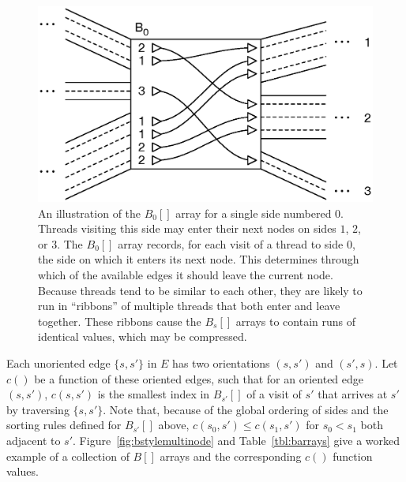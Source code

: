 \begin{figure}[h!]
\centering
\includegraphics[width=\linewidth]{figures/03_gpbwt/barray.eps}
\caption{An illustration of the $B_{0}[]$ array for a single side numbered $0$. Threads visiting this side may enter their next nodes on sides $1$, $2$, or $3$. The $B_0[]$ array records, for each visit of a thread to side $0$, the side on which it enters its next node. This determines through which of the available edges it should leave the current node. Because threads tend to be similar to each other, they are likely to run in ``ribbons'' of multiple threads that both enter and leave together. These ribbons cause the $B_s[]$ arrays to contain runs of identical values, which may be compressed.}
\label{fig:barray}
\end{figure}

Each unoriented edge $\{ s, s' \}$ in $E$ has two orientations $(s, s')$ and $(s', s)$. Let $c()$ be a function of these oriented edges, such that for an oriented edge $( s, s' )$, $c(s, s')$ is the smallest index in $B_{s'}[]$ of a visit of $s'$ that arrives at $s'$ by traversing $\{ s, s' \}$. Note that, because of the global ordering of sides and the sorting rules defined for $B_{s'}[]$ above, $c(s_0, s') \leq c(s_1, s')$ for $s_0 < s_1$ both adjacent to $s'$. Figure~\ref{fig:bstylemultinode} and Table~\ref{tbl:barrays} give a worked example of a collection of $B[]$ arrays and the corresponding $c()$ function values.


